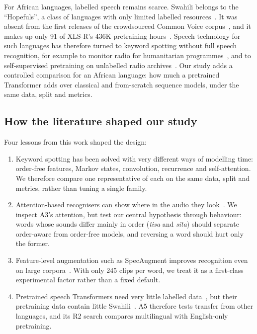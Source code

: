 For African languages, labelled speech remains scarce. Swahili belongs to the ``Hopefuls'', a class of languages
with only limited labelled resources~\cite{joshi2020state}. It was absent from the first releases of the
crowdsourced Common Voice corpus~\cite{ardila2020common}, and it makes up only 91 of XLS-R's 436K pretraining
hours~\cite{babu2022xlsr}. Speech technology for such languages has therefore turned to keyword spotting without
full speech recognition, for example to monitor radio for humanitarian programmes~\cite{menon2018fast}, and to
self-supervised pretraining on unlabelled radio archives~\cite{doumbouya2021using}. Our study adds a controlled
comparison for an African language: how much a pretrained Transformer adds over classical and from-scratch sequence
models, under the same data, split and metrics.

\subsection{How the literature shaped our study}
Four lessons from this work shaped the design:
\begin{enumerate}
  \item Keyword spotting has been solved with very different ways of modelling time: order-free features,
        Markov states, convolution, recurrence and self-attention. We therefore compare one representative of
        each on the same data, split and metrics, rather than tuning a single family.
  \item Attention-based recognisers can show where in the audio they look~\cite{deandrade2018neural}. We inspect
        A3's attention, but test our central hypothesis through behaviour: words whose sounds differ mainly in order
        (\textit{tisa} and \textit{sita}) should separate order-aware from order-free models, and reversing a word
        should hurt only the former.
  \item Feature-level augmentation such as SpecAugment improves recognition even on large
        corpora~\cite{park2019specaugment}. With only 245 clips per word, we treat it as a first-class experimental
        factor rather than a fixed default.
  \item Pretrained speech Transformers need very little labelled data~\cite{baevski2020wav2vec}, but their
        pretraining data contain little Swahili~\cite{babu2022xlsr}. A5 therefore tests transfer from other
        languages, and its R2 search compares multilingual with English-only pretraining.
\end{enumerate}
